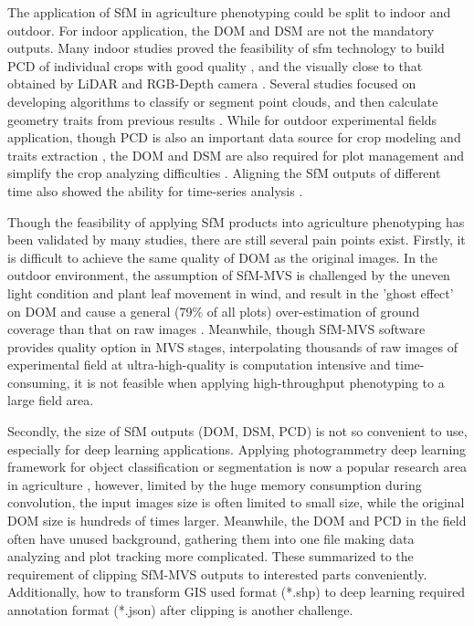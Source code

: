 \documentclass{configs/bmcart}
\begin{document}
The application of SfM in agriculture phenotyping could be split to indoor and outdoor. For indoor application, the DOM and DSM are not the mandatory outputs. Many indoor studies proved the feasibility of \acrshort*{sfm} technology to build PCD of individual crops with good quality \cite{wang_maize_2019, rossi_performances_2020}, and the visually close to that obtained by LiDAR \cite{thapa_novel_2018} and RGB-Depth camera \cite{martinez-guanter_low-cost_2019}. Several studies focused on developing algorithms to classify or segment point clouds, and then calculate geometry traits from previous results \cite{ziamtsov_machine_2019, artzet_phenomenal:_2019}. While for outdoor experimental fields application, though PCD is also an important data source for crop modeling and traits extraction \cite{jay_-field_2015, sun_three-dimensional_2020, zhu_quantification_2020}, the DOM and DSM are also required for plot management and simplify the crop analyzing difficulties \cite{sun_-field_2018, tresch_easy_2019, chen_grid_2020}. Aligning the SfM outputs of different time also showed the ability for time-series analysis \cite{dong_4d_2017, han_clustering_2018}.

Though the feasibility of applying SfM products into agriculture phenotyping has been validated by many studies, there are still several pain points exist. Firstly, it is difficult to achieve the same quality of DOM as the original images. In the outdoor environment, the assumption of SfM-MVS is challenged by the uneven light condition and plant leaf movement in wind, and result in the 'ghost effect' on DOM and cause a general (79\% of all plots) over-estimation of ground coverage than that on raw images \cite{duan_comparison_2017}. Meanwhile, though SfM-MVS software provides quality option in MVS stages, interpolating thousands of raw images of experimental field at ultra-high-quality is computation intensive and time-consuming, it is not feasible when applying high-throughput phenotyping to a large field area. 

Secondly, the size of SfM outputs (DOM, DSM, PCD) is not so convenient to use, especially for deep learning applications. Applying photogrammetry deep learning framework for object classification or segmentation is now a popular research area in agriculture \cite{zhou_fast_2020, feng_evaluation_2020, desai_automatic_2019}, however, limited by the huge memory consumption during convolution, the input images size is often limited to small size, while the original DOM size is hundreds of times larger. Meanwhile, the DOM and PCD in the field often have unused background, gathering them into one file making data analyzing and plot tracking more complicated. These summarized to the requirement of clipping SfM-MVS outputs to interested parts conveniently. Additionally, how to transform GIS used format (*.shp) to deep learning required annotation format (*.json) after clipping is another challenge. 
\end{document}
